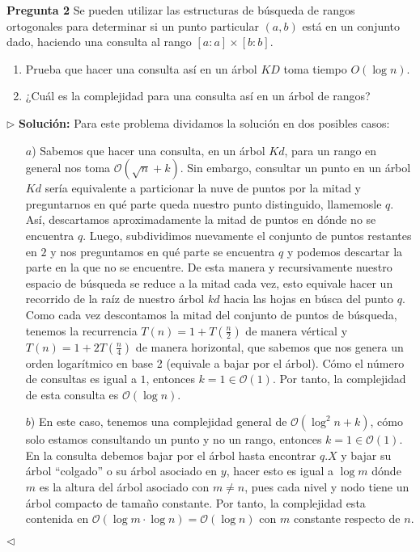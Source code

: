 \textbf{Pregunta 2}
Se pueden utilizar las estructuras de búsqueda de rangos ortogonales para determinar si un punto particular $(a,b)$ está en un conjunto dado, haciendo una consulta al rango $[a:a] \times [b:b]$.
\begin{enumerate}
   \item Prueba que hacer una consulta así en un árbol $KD$ toma tiempo $O(\log n)$.
   \item ¿Cuál es la complejidad para una consulta así en un árbol de rangos?
\end{enumerate}

$\rhd$ \textbf{Solución:} Para este problema dividamos la solución en dos posibles casos:
\begin{enumerate}
\item[$a$)] Sabemos que hacer una consulta, en un árbol $Kd$, para un rango en
general nos toma $\mathcal{O}(\sqrt{n} + k)$. Sin embargo, consultar un punto
en un árbol $Kd$ sería equivalente a particionar la nuve de puntos por la mitad
y preguntarnos en qué parte queda nuestro punto distinguido, llamemosle $q$. Así,
descartamos aproximadamente la mitad de puntos en dónde no se encuentra $q$. Luego,
subdividimos nuevamente el conjunto de puntos restantes en $2$ y nos preguntamos
en qué parte se encuentra $q$ y podemos descartar la parte en la que no se encuentre.
De esta manera y recursivamente nuestro espacio de búsqueda se reduce a la mitad cada
vez, esto equivale hacer un recorrido de la raíz de nuestro árbol $kd$ hacia las hojas
en búsca del punto $q$. Como cada vez descontamos la mitad del conjunto de puntos
de búsqueda, tenemos la recurrencia $T(n) = 1 + T(\frac{n}{2})$ de manera vértical y
$T(n) = 1 + 2T(\frac{n}{4})$ de manera horizontal, que sabemos que nos genera
un orden logarítmico en base 2 (equivale a bajar por el árbol). Cómo el número de
consultas es igual a $1$, entonces $k = 1 \in \mathcal{O}(1)$. Por tanto, la complejidad
de esta consulta es $\mathcal{O}(\log n)$.
\item[$b$)] En este caso, tenemos una complejidad general de $\mathcal{O}(\log^2 n + k)$,
cómo solo estamos consultando un punto y no un rango, entonces $k = 1 \in \mathcal{O}(1)$.
En la consulta debemos bajar por el árbol hasta encontrar $q.X$ y bajar su árbol ``colgado''
o su árbol asociado en $y$, hacer esto es igual a $\log m$ dónde $m$ es la altura del árbol
asociado con $m \not= n$, pues cada nivel y nodo tiene un árbol compacto de tamaño constante.
Por tanto, la complejidad esta contenida en $\mathcal{O}(\log m \cdot \log n) = \mathcal{O}(\log n)$
con $m$ constante respecto de $n$.

\end{enumerate}
\hfill $\lhd$


